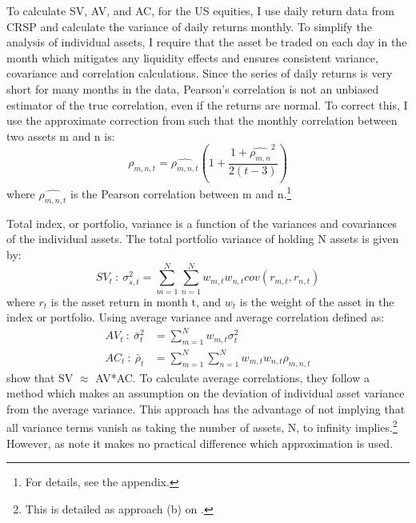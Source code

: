 To calculate SV, AV, and AC, for the US equities, I use daily return data from CRSP and calculate the variance of daily returns monthly. To simplify the analysis of individual assets, I require that the asset be traded on each day in the month which mitigates any liquidity effects and ensures consistent variance, covariance and correlation calculations. Since the series of daily returns is very short for many months in the data, Pearson’s correlation is not an unbiased estimator of the true correlation, even if the returns are normal. \citep{hotelling_1953} To correct this, I use the approximate correction from \cite{olkin_1958} such that the monthly correlation between two assets m and n is:
\begin{equation}
\rho_{m,n,t} = \widehat{\rho_{m,n,t}}\left(1 + \frac{1+\widehat{\rho_{m,n}}^{2}}{2(t-3)}\right)
\end{equation}
where $\widehat{\rho_{m,n,t}}$ is the Pearson correlation between m and n.\footnote{For details, see the appendix.}

Total index, or portfolio, variance is a function of the variances and covariances of the individual assets. The total portfolio variance of holding N assets is given by:
\begin{equation}
SV_{t} ~:~ \sigma^{2}_{s,t} =  \sum_{m=1}^{N}\sum_{n=1}^{N}w_{m,t}w_{n,t}cov(r_{m,t},r_{n,t})
\end{equation}
where $r_{t}$ is the asset return in month t, and $w_{t}$ is the weight of the asset in the index or portfolio. Using average variance and average correlation defined as:
\begin{align}
AV_{t} ~:~ \bar{\sigma}^{2}_{t} &= \sum_{m=1}^{N}w_{m,t}\sigma^{2}_{t}\\
AC_{t} ~:~ \bar{\rho}_{t} &= \sum_{m=1}^{N}\sum_{n=1}^{N}w_{m,t}w_{n,t}\rho_{m,n,t}
\end{align}
\citet{pollet_average_2010} show that SV $\approx$ AV*AC. To calculate average correlations, they follow a method which makes an assumption on the deviation of individual asset variance from the average variance. This approach has the advantage of not implying that all variance terms vanish as taking the number of assets, N, to infinity implies.\footnote{This is detailed as approach (b) on \citet{nematrian}.} However, as \citet{tierens_anadu} note it makes no practical difference which approximation is used.

